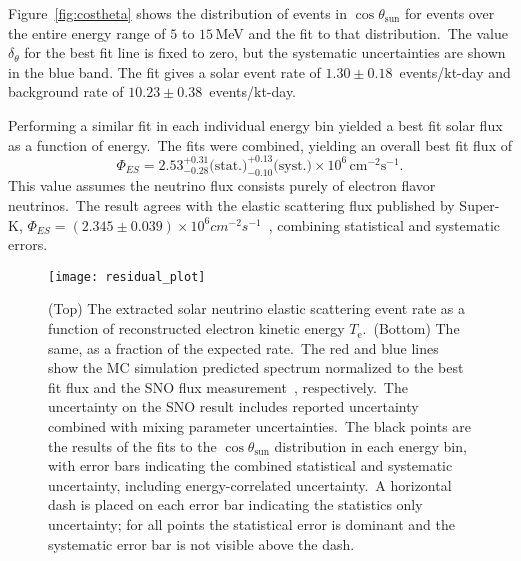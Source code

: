 Figure~\ref{fig:costheta} shows the distribution of events in $\cos\theta_\text{{sun}}$
for events over the entire energy range of $5$ to $15$\,MeV and the fit to that distribution.\
The value $\delta_\theta$ for the best fit line is fixed to zero, but the 
systematic uncertainties are shown in the blue band.
The fit gives a solar event rate of $1.30\pm0.18$~events/kt-day
 and background rate of  $10.23\pm0.38$~events/kt-day.

Performing a similar fit in each individual energy bin yielded a best fit solar flux
as a function of energy.\
The fits were combined,  yielding an overall best fit flux of
\begin{equation*}
    \Phi_{ES}= 2.53^{+0.31}_{-0.28}\text{(stat.)}^{+0.13}_{-0.10}\text{(syst.)}\times10^6\,\text{cm}^{-2}\text{s}^{-1}\text{.}
\end{equation*}
This value assumes the neutrino flux consists purely of electron flavor neutrinos.\
The result agrees with the elastic scattering flux published by Super-K,
$\Phi_{ES}=\left(2.345\pm0.039\right)\times10^{6}cm^{-2}s^{-1}$~\citep{superk4},
combining statistical and systematic errors.

\begin{figure}
  \centering
  \texttt{[image: residual\_plot]}
  \caption[Solar Spectrum Data to MC Comparison]{
    (Top) The extracted solar neutrino elastic scattering event rate as a
    function of reconstructed electron kinetic energy $T_{\mathrm{e}}$.\
    (Bottom) The same, as a fraction of the expected rate.\
    The red and blue lines show the MC simulation predicted spectrum normalized
    to the best fit flux and the SNO flux measurement~\citep{sno_combined}, respectively.\
    The uncertainty on the SNO result includes reported uncertainty combined with
    mixing parameter uncertainties.\
    The black points are the results of the fits to the $\cos\theta_\text{{sun}}$
    distribution in each energy bin,
    with error bars indicating the combined statistical and systematic
    uncertainty, including energy-correlated uncertainty.\
    A horizontal dash is placed on each error bar indicating the statistics
    only uncertainty; for all points the statistical error is dominant and the systematic
    error bar is not visible above the dash.}
  \label{fig:spectrum}
\end{figure}

